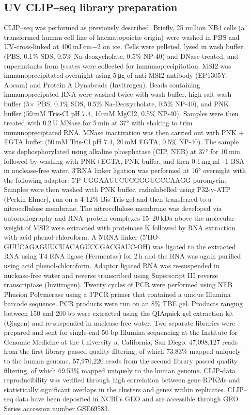 \subsection{UV CLIP–seq library preparation}
CLIP–seq was performed as previously described\cite{Yeo2009}. Briefly, 25 million NB4 cells (a transformed human cell line of haematopoietic origin) were washed in PBS and UV-cross-linked at 400 mJ cm−2 on ice. Cells were pelleted, lysed in wash buffer (PBS, 0.1\% SDS, 0.5\% Na-deoxycholate, 0.5\% NP-40) and DNase-treated, and supernatants from lysates were collected for immunoprecipitation. MSI2 was immunoprecipitated overnight using 5 μg of anti-MSI2 antibody (EP1305Y, Abcam) and Protein A Dynabeads (Invitrogen). Beads containing immunoprecipated RNA were washed twice with wash buffer, high-salt wash buffer (5× PBS, 0.1\% SDS, 0.5\% Na-Deoxycholate, 0.5\% NP-40), and PNK buffer (50 mM Tris-Cl pH 7.4, 10 mM MgCl2, 0.5\% NP-40). Samples were then treated with 0.2 U MNase for 5 min at 37° with shaking to trim immunopreciptated RNA. MNase inactivation was then carried out with PNK + EGTA buffer (50 mM Tris-Cl pH 7.4, 20 mM EGTA, 0.5\% NP-40). The sample was dephosphorylated using alkaline phosphatase (CIP, NEB) at 37° for 10 min followed by washing with PNK+EGTA, PNK buffer, and then 0.1 mg ml−1 BSA in nuclease-free water. 3′RNA linker ligation was performed at 16° overnight with the following adaptor: 5′P-UGGAAUUCUCGGGUGCCAAGG-puromycin. Samples were then washed with PNK buffer, radiolabelled using P32-y-ATP (Perkin Elmer), run on a 4-12\% Bis-Tris gel and then transferred to a nitrocellulose membrane. The nitrocellulose membrane was developed via autoradiography and RNA–protein complexes 15–20 kDa above the molecular weight of MSI2 were extracted with proteinase K followed by RNA extraction with acid phenol-chloroform. A 5′RNA linker (5′HO-GUUCAGAGUUCUACAGUCCGACGAUC-OH) was ligated to the extracted RNA using T4 RNA ligase (Fermentas) for 2 h and the RNA was again purified using acid phenol-chloroform. Adaptor ligated RNA was re-suspended in nuclease-free water and reverse transcribed using Superscript III reverse transcriptase (Invitrogen). Twenty cycles of PCR were performed using NEB Phusion Polymerase using a 3′PCR primer that contained a unique Illumina barcode sequence. PCR products were run on an 8\% TBE gel. Products ranging between 150 and 200 bp were extracted using the QIAquick gel extraction kit (Qiagen) and re-suspended in nuclease-free water. Two separate libraries were prepared and sent for single-end 50-bp Illumina sequencing at the Institute for Genomic Medicine at the University of California, San Diego. 47,098,127 reads from the first library passed quality filtering, of which 73.83\% mapped uniquely to the human genome. 57,970,220 reads from the second library passed quality filtering, of which 69.53\% mapped uniquely to the human genome. CLIP-data reproducibility was verified through high correlation between gene RPKMs and statistically significant overlaps in the clusters and genes within replicates. CLIP–seq data have been deposited in NCBI’s GEO and are accessible through GEO Series accession number GSE69583.


